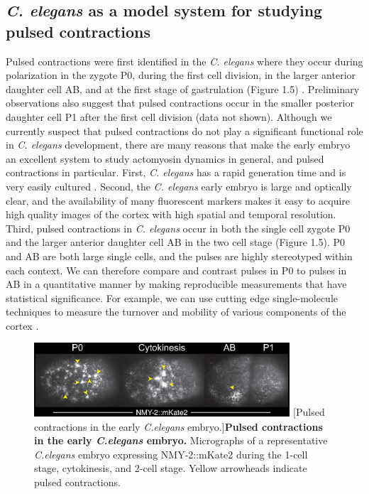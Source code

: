 \documentclass{ucetd}
\begin{document}
\subsection{\textit{C. elegans} as a model system for studying pulsed contractions}
Pulsed contractions were first identified in the \textit{C. elegans} where they occur during polarization in the zygote P0, during the first cell division, in the larger anterior daughter cell AB, and at the first stage of gastrulation (Figure 1.5) \cite{Munro:2004jk, RohJohnson:2012cf}.  Preliminary observations also suggest that pulsed contractions occur in the smaller posterior daughter cell P1 after the first cell division (data not shown).  Although we currently suspect that pulsed contractions do not play a significant functional role in \textit{C. elegans} development, there are many reasons that make the early embryo an excellent system to study actomyosin dynamics in general, and pulsed contractions in particular.  First, \textit{C. elegans} has a rapid generation time and is very easily cultured \cite{Jorgensen:2002ej}.  Second, the \textit{C. elegans} early embryo is large and optically clear, and the availability of many fluorescent markers makes it easy to acquire high quality images of the cortex with high spatial and temporal resolution.  Third, pulsed contractions in \textit{C. elegans} occur in both the single cell zygote P0 and the larger anterior daughter cell AB in the two cell stage (Figure 1.5).  P0 and AB are both large single cells, and the pulses are highly stereotyped within each context.  We can therefore compare and contrast pulses in P0 to pulses in AB in a quantitative manner by making reproducible measurements that have statistical significance.  For example, we can use cutting edge single-molecule techniques to measure the turnover and mobility of various components of the cortex \cite{Robin:2014jf}. 

\begin{figure}[!htbp]
\centering
\includegraphics[width=0.85\textwidth]{Figure1-5}
[Pulsed contractions in the early \textit{C.elegans} embryo.]{\textbf{Pulsed contractions in the early \textit{C.elegans} embryo.} Micrographs of a representative \textit{C.elegans} embryo expressing NMY-2::mKate2 during the 1-cell stage, cytokinesis, and 2-cell stage.  Yellow arrowheads indicate pulsed contractions.}
\end{figure}
\end{document}
